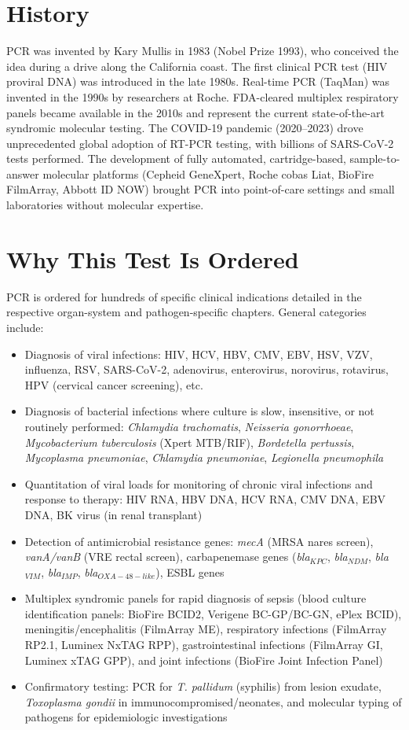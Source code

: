 \section*{History}
PCR was invented by Kary Mullis in 1983 (Nobel Prize 1993), who conceived the idea during a drive along the California coast. The first clinical PCR test (HIV proviral DNA) was introduced in the late 1980s. Real-time PCR (TaqMan) was invented in the 1990s by researchers at Roche. FDA-cleared multiplex respiratory panels became available in the 2010s and represent the current state-of-the-art syndromic molecular testing. The COVID-19 pandemic (2020--2023) drove unprecedented global adoption of RT-PCR testing, with billions of SARS-CoV-2 tests performed. The development of fully automated, cartridge-based, sample-to-answer molecular platforms (Cepheid GeneXpert, Roche cobas Liat, BioFire FilmArray, Abbott ID NOW) brought PCR into point-of-care settings and small laboratories without molecular expertise.

\section*{Why This Test Is Ordered}
PCR is ordered for hundreds of specific clinical indications detailed in the respective organ-system and pathogen-specific chapters. General categories include:
\begin{itemize}
  \item Diagnosis of viral infections: HIV, HCV, HBV, CMV, EBV, HSV, VZV, influenza, RSV, SARS-CoV-2, adenovirus, enterovirus, norovirus, rotavirus, HPV (cervical cancer screening), etc.
  \item Diagnosis of bacterial infections where culture is slow, insensitive, or not routinely performed: \textit{Chlamydia trachomatis}, \textit{Neisseria gonorrhoeae}, \textit{Mycobacterium tuberculosis} (Xpert MTB/RIF), \textit{Bordetella pertussis}, \textit{Mycoplasma pneumoniae}, \textit{Chlamydia pneumoniae}, \textit{Legionella pneumophila}
  \item Quantitation of viral loads for monitoring of chronic viral infections and response to therapy: HIV RNA, HBV DNA, HCV RNA, CMV DNA, EBV DNA, BK virus (in renal transplant)
  \item Detection of antimicrobial resistance genes: \textit{mecA} (MRSA nares screen), \textit{vanA/vanB} (VRE rectal screen), carbapenemase genes (\textit{bla}$_{KPC}$, \textit{bla}$_{NDM}$, \textit{bla}$_{VIM}$, \textit{bla}$_{IMP}$, \textit{bla}$_{OXA-48-like}$), ESBL genes
  \item Multiplex syndromic panels for rapid diagnosis of sepsis (blood culture identification panels: BioFire BCID2, Verigene BC-GP/BC-GN, ePlex BCID), meningitis/encephalitis (FilmArray ME), respiratory infections (FilmArray RP2.1, Luminex NxTAG RPP), gastrointestinal infections (FilmArray GI, Luminex xTAG GPP), and joint infections (BioFire Joint Infection Panel)
  \item Confirmatory testing: PCR for \textit{T. pallidum} (syphilis) from lesion exudate, \textit{Toxoplasma gondii} in immunocompromised/neonates, and molecular typing of pathogens for epidemiologic investigations
\end{itemize}

